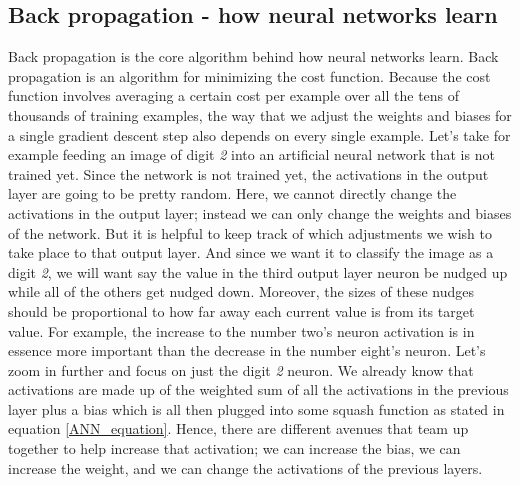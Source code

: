 \documentclass[master]{thesis-uestc}
\begin{document}
\subsection*{Back propagation - how neural networks learn}
Back propagation is the core algorithm behind how neural networks learn. Back propagation is an algorithm for minimizing the cost function. Because the cost function involves averaging a certain cost per example over all the tens of thousands of training examples, the way that we adjust the weights and biases for a single gradient descent step also depends on every single example. Let's take for example feeding an image of digit \textit{2}  into an artificial neural network that is not trained yet. Since the network is not trained yet, the activations in the output layer are going to be pretty random. Here, we cannot directly change the activations in the output layer; instead we can only change the weights and biases of the network. But it is helpful to keep track of which adjustments we wish to take place to that output layer. And since we want it to classify the image as a digit \textit{2}, we will want say the value in the third output layer neuron be nudged up while all of the others get nudged down. Moreover, the sizes of these nudges should be proportional to how far away each current value is from its target value. For example, the increase to the number two's neuron activation is in essence more important than the decrease in the number eight's neuron. Let's zoom in further and focus on just the digit \textit{2} neuron. We already know that activations are made up of the weighted sum of all the activations in the previous layer plus a bias which is all then plugged into some squash function as stated in equation \ref{ANN_equation}. Hence, there are different avenues that team up together to help increase that activation; we can increase the bias, we can increase the weight, and we can change the activations of the previous layers.
\end{document}
